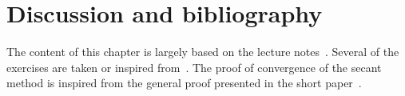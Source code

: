 \section{Discussion and bibliography}

The content of this chapter is largely based on the lecture notes~\cite{VanDooren}.
Several of the exercises are taken or inspired from~\cite{Legat}.
The proof of convergence of the secant method is inspired from the general proof presented in the short paper~\cite{MR1186462}.
